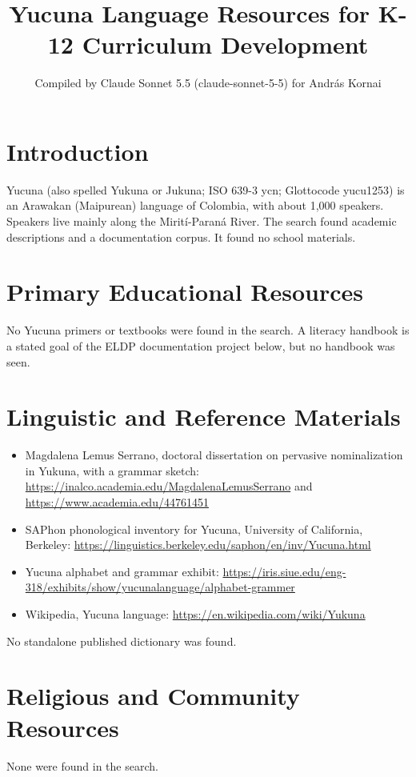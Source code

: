 \documentclass[12pt]{article}
\title{Yucuna Language Resources for K-12 Curriculum Development}
\author{Compiled by Claude Sonnet 5.5 (claude-sonnet-5-5) for Andr\'as Kornai}
\date{}
\begin{document}
\maketitle

\section{Introduction}
Yucuna (also spelled Yukuna or Jukuna; ISO 639-3 ycn; Glottocode yucu1253) is an Arawakan (Maipurean) language of Colombia, with about 1,000 speakers. Speakers live mainly along the Mirit\'i-Paran\'a River. The search found academic descriptions and a documentation corpus. It found no school materials.

\section{Primary Educational Resources}
No Yucuna primers or textbooks were found in the search. A literacy handbook is a stated goal of the ELDP documentation project below, but no handbook was seen.

\section{Linguistic and Reference Materials}
\begin{itemize}
\item Magdalena Lemus Serrano, doctoral dissertation on pervasive nominalization in Yukuna, with a grammar sketch: \url{https://inalco.academia.edu/MagdalenaLemusSerrano} and \url{https://www.academia.edu/44761451}
\item SAPhon phonological inventory for Yucuna, University of California, Berkeley: \url{https://linguistics.berkeley.edu/saphon/en/inv/Yucuna.html}
\item Yucuna alphabet and grammar exhibit: \url{https://iris.siue.edu/eng-318/exhibits/show/yucunalanguage/alphabet-grammer}
\item Wikipedia, Yucuna language: \url{https://en.wikipedia.com/wiki/Yukuna}
\end{itemize}
No standalone published dictionary was found.

\section{Religious and Community Resources}
None were found in the search.
\end{document}
